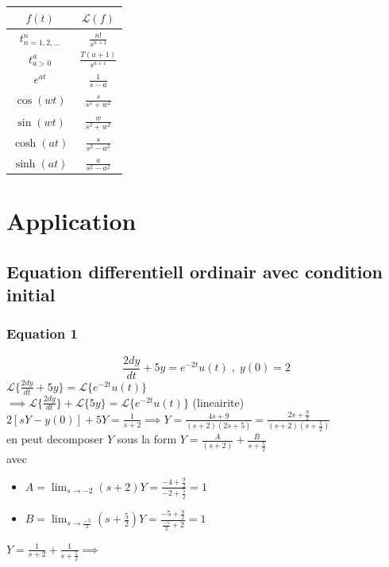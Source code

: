 \documentclass[12pt]{book}
\newcommand{\lagrange}{\mathcal{L}}
\begin{document}
            \begin{table}[h]
                \LARGE
                \centering
                \begin{tabular}{|c|c|}
                    \hline
                    $ f(t) $ & $\lagrange(f)$ \\ \hline
                    $ t^n_{n=1,2,\ldots} $ & $\frac{n!}{s^{n+1}}$  \\ \hline
                    $ t^a_{a>0} $ & $\frac{T(a+1)}{s^{a+1}}$ \\ \hline
                    $ e^{at} $ & $\frac{1}{s-a}$ \\ \hline
                    $ \cos(wt) $ & $\frac{s}{s^2 + w^2}$ \\ \hline
                    $ \sin(wt) $ & $\frac{w}{s^2+w^2}$ \\ \hline
                    $\cosh(at)$ & $\frac{s}{s^2-a^2}$  \\ \hline
                    $ \sinh(at) $ & $ \frac{a}{s^2-a^2} $ \\ \hline
                \end{tabular}
            \end{table}
        \section{Application }
            \subsection{Equation differentiell ordinair avec condition initial}
                \subsubsection*{Equation 1 }
                    $$ \frac{2dy}{dt} +5y = e^{-2t}u(t) \;,\; y(0) = 2 $$
                    $\lagrange\{ \frac{2dy}{dt}+5y \} = \lagrange\{ e^{-2t}u(t) \}$\\ 
                    $\implies \lagrange\{ \frac{2dy}{dt}\}+ \lagrange\{5y \} = \lagrange\{ e^{-2t}u(t) \}$ (lineairite) \\
                    $2[sY-y(0)]+5Y = \frac{1}{s+2} \implies Y =\frac{4s +9}{(s+2)(2s+5)}=\frac{2s + \frac{9}{2}}{(s+2)(s+\frac{5}{2})}$ \\
                    en peut decomposer $Y$ sous la form $ Y=\frac{A}{(s+2)} + \frac{B}{s+\frac{5}{2}} $ \\
                    avec \begin{itemize}
                        \item $A = \lim_{s\to -2}(s+2)Y=\frac{-4 + \frac{9}{2}}{-2 + \frac{5}{2}}=1$
                        \item $B = \lim_{s\to \frac{-5}{2}} (s+\frac{5}{2})Y = \frac{-5 + \frac{9}{2}}{\frac{-5}{2}+2} = 1$
                    \end{itemize}
                    $Y = \frac{1}{s+2}+\frac{1}{s+\frac{5}{2}} \implies$
\end{document}
